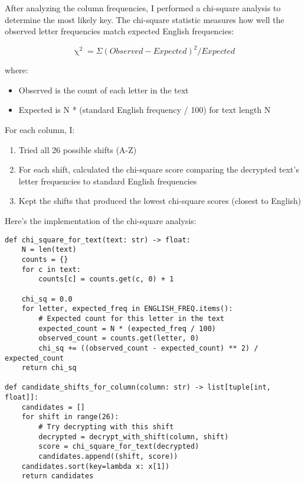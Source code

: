 \documentclass[12pt]{article}
\begin{document}
After analyzing the column frequencies, I performed a chi-square analysis to determine the most likely key. The chi-square statistic measures how well the observed letter frequencies match expected English frequencies:

\begin{equation*}
    \upchi^2 = \Sigma(Observed - Expected)^2/Expected
\end{equation*}

where:
\begin{itemize}
    \item Observed is the count of each letter in the text
    \item Expected is N * (standard English frequency / 100) for text length N
\end{itemize}

For each column, I:
\begin{enumerate}
    \item Tried all 26 possible shifts (A-Z)
    \item For each shift, calculated the chi-square score comparing the decrypted text's letter frequencies to standard English frequencies
    \item Kept the shifts that produced the lowest chi-square scores (closest to English)
\end{enumerate}

\vspace{1em}
Here's the implementation of the chi-square analysis:

\begin{lstlisting}[style=python]
def chi_square_for_text(text: str) -> float:
    N = len(text)
    counts = {}
    for c in text:
        counts[c] = counts.get(c, 0) + 1

    chi_sq = 0.0
    for letter, expected_freq in ENGLISH_FREQ.items():
        # Expected count for this letter in the text
        expected_count = N * (expected_freq / 100)
        observed_count = counts.get(letter, 0)
        chi_sq += ((observed_count - expected_count) ** 2) / expected_count
    return chi_sq

def candidate_shifts_for_column(column: str) -> list[tuple[int, float]]:
    candidates = []
    for shift in range(26):
        # Try decrypting with this shift
        decrypted = decrypt_with_shift(column, shift)
        score = chi_square_for_text(decrypted)
        candidates.append((shift, score))
    candidates.sort(key=lambda x: x[1])
    return candidates
\end{lstlisting}
\end{document}
